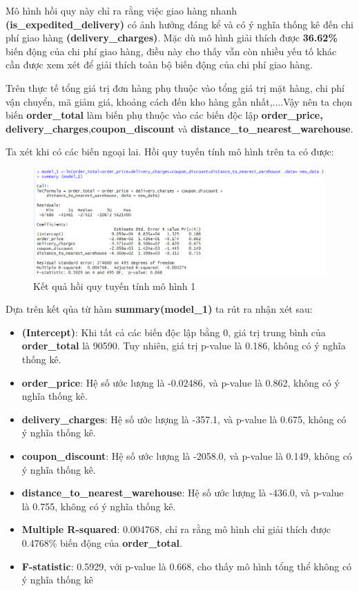  Mô hình hồi quy này chỉ ra rằng việc giao hàng nhanh \textbf{(is\_expedited\_delivery)} có ảnh hưởng đáng kể và có ý nghĩa thống kê đến chi phí giao hàng \textbf{(delivery\_charges)}. Mặc dù mô hình giải thích được \textbf{36.62\%} biến động của chi phí giao hàng, điều này cho thấy vẫn còn nhiều yếu tố khác cần được xem xét để giải thích toàn bộ biến động của chi phí giao hàng.

Trên thực tế tổng giá trị đơn hàng phụ thuộc vào tổng giá trị mặt hàng, chi phí vận chuyển, mã giảm giá, khoảng cách đến kho hàng gần nhất,....Vậy nên ta chọn biến \textbf{order\_total} làm biến phụ thuộc vào các biến độc lập \textbf{order\_price, delivery\_charges},\textbf{coupon\_discount} và \textbf{distance\_to\_nearest\_warehouse}.

Ta xét khi có các biến ngoại lai. Hồi quy tuyến tính mô hình trên ta có được:
\begin{figure}[H]
  \centering
  \includegraphics[width=0.7\linewidth]{graphics/5.5.2.png}
  \caption{Kết quả hồi quy tuyến tính mô hình 1 }
\end{figure}

Dựa trên kết qủa từ hàm \textbf{summary(model\_1)} ta rút ra nhận xét sau:
\begin{itemize}
\item \textbf{(Intercept)}: Khi tất cả các biến độc lập bằng 0, giá trị trung bình của \textbf{order\_total} là 90590. Tuy nhiên, giá trị p-value là 0.186, không có ý nghĩa thống kê.
\item \textbf{order\_price}: Hệ số ước lượng là -0.02486, và p-value là 0.862, không có ý nghĩa thống kê.
\item \textbf{delivery\_charges}: Hệ số ước lượng là -357.1, và p-value là 0.675, không có ý nghĩa thống kê.
\item \textbf{coupon\_discount}: Hệ số ước lượng là -2058.0, và p-value là 0.149, không có ý nghĩa thống kê.
\item \textbf{distance\_to\_nearest\_warehouse}: Hệ số ước lượng là -436.0, và p-value là 0.755, không có ý nghĩa thống kê.
\item\textbf{Multiple R-squared}: 0.004768, chỉ ra rằng mô hình chỉ giải thích được 0.4768\% biến động của \textbf{order\_total}.
\item\textbf{F-statistic}: 0.5929, với p-value là 0.668, cho thấy mô hình tổng thể không có ý nghĩa thống kê
\end{itemize}

